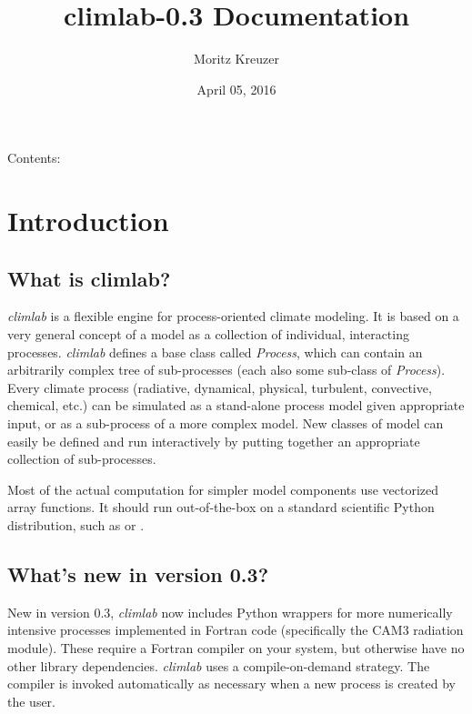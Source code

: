 \documentclass[a4paper,10pt,english]{sphinxmanual}
\title{climlab-0.3 Documentation}
\date{April 05, 2016}
\author{Moritz Kreuzer}
\begin{document}
\maketitle
\tableofcontents
{}\label{index::doc}


Contents:


\chapter{Introduction}
\label{intro:introduction}\label{intro::doc}\label{intro:welcome-to-the-climlab-documentation}\label{intro:id1}

\section{What is climlab?}
\label{intro:what-is-climlab}
\emph{climlab} is a flexible engine for process-oriented climate modeling.
It is based on a very general concept of a model as a collection of individual,
interacting processes. \emph{climlab} defines a base class called \emph{Process}, which
can contain an arbitrarily complex tree of sub-processes (each also some
sub-class of \emph{Process}). Every climate process (radiative, dynamical,
physical, turbulent, convective, chemical, etc.) can be simulated as a stand-alone
process model given appropriate input, or as a sub-process of a more complex model.
New classes of model can easily be defined and run interactively by putting together an
appropriate collection of sub-processes.

Most of the actual computation for simpler model components use vectorized
 array functions. It should run out-of-the-box on a standard scientific
Python distribution, such as  or .


\section{What's new in version 0.3?}
\label{intro:what-s-new-in-version-0-3}
New in version 0.3, \emph{climlab} now includes Python wrappers for more
numerically intensive processes implemented in Fortran code (specifically the
CAM3 radiation module). These require a Fortran compiler on your system,
but otherwise have no other library dependencies.  \emph{climlab} uses a compile-on-demand
strategy. The compiler is invoked automatically as necessary when a new process
is created by the user.
\end{document}
